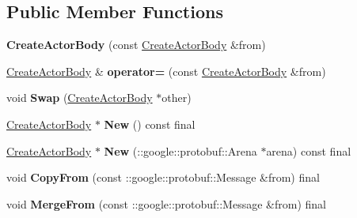\subsection*{Public Member Functions}
\begin{DoxyCompactItemize}
\item 
\mbox{\label{classtbBasics_1_1CreateActorBody_a4227ff7ff1f60f792a3b97a793dc2862}} 
{\bfseries Create\+Actor\+Body} (const \hyperlink{classtbBasics_1_1CreateActorBody}{Create\+Actor\+Body} \&from)
\item 
\mbox{\label{classtbBasics_1_1CreateActorBody_a0622d7bfb7da8c3efd2eaab74aeaf511}} 
\hyperlink{classtbBasics_1_1CreateActorBody}{Create\+Actor\+Body} \& {\bfseries operator=} (const \hyperlink{classtbBasics_1_1CreateActorBody}{Create\+Actor\+Body} \&from)
\item 
\mbox{\label{classtbBasics_1_1CreateActorBody_afd40d70bcc48ca08c552a4e7a4c0c8c6}} 
void {\bfseries Swap} (\hyperlink{classtbBasics_1_1CreateActorBody}{Create\+Actor\+Body} $\ast$other)
\item 
\mbox{\label{classtbBasics_1_1CreateActorBody_ac27f1379b5e5cf1f4d48bba69747ef07}} 
\hyperlink{classtbBasics_1_1CreateActorBody}{Create\+Actor\+Body} $\ast$ {\bfseries New} () const final
\item 
\mbox{\label{classtbBasics_1_1CreateActorBody_a03daca41ae34ae0c2802837d751b701e}} 
\hyperlink{classtbBasics_1_1CreateActorBody}{Create\+Actor\+Body} $\ast$ {\bfseries New} (\+::google\+::protobuf\+::\+Arena $\ast$arena) const final
\item 
\mbox{\label{classtbBasics_1_1CreateActorBody_a6d5b173a1a28c7e2ed1a995d4bf0b687}} 
void {\bfseries Copy\+From} (const \+::google\+::protobuf\+::\+Message \&from) final
\item 
\mbox{\label{classtbBasics_1_1CreateActorBody_a7ea37b3f9cec2883a468859907da8181}} 
void {\bfseries Merge\+From} (const \+::google\+::protobuf\+::\+Message \&from) final
\item 
\mbox{\label{classtbBasics_1_1CreateActorBody_a1b9ec0c3b0815e6d56472ba830910d71}} 

\end{DoxyCompactItemize}
